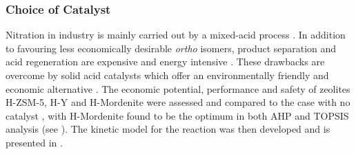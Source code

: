 \subsubsection{Choice of Catalyst}
Nitration in industry is mainly carried out by a mixed-acid process \cite{halder_nitration_2007}.
In addition to favouring less economically desirable \textit{ortho} isomers, product separation and acid regeneration are expensive and energy intensive \cite{sreedhar_scientific_2013}.
These drawbacks are overcome by solid acid catalysts which offer an environmentally friendly and economic alternative \cite{vassena_selective_1999}.
The economic potential, performance and safety of zeolites H-ZSM-5, H-Y and H-Mordenite were assessed and compared to the case with no catalyst \cite{jeeru_kinetics_2018}, with H-Mordenite found to be the optimum in both AHP and TOPSIS analysis (see ).
The kinetic model for the reaction was then developed and is presented in .

\begin{comment}
Nitration in industry is mainly carried out by a mixed-acid process, whereby sulfuric acid donates a proton to nitric acid, yielding a nitronium ion which will then react with toluene []. In addition to favouring less economically desirable \textit{ortho} isomers, product separation from the acid and acid regeneration are expensive and energy intensive \cite{sreedhar_scientific_2013}. These drawbacks can be overcome by using solid acid catalysts which offer an environmentally friendly and economic alternative to sulfuric acid \cite{vassena_selective_1999}. Based on those arguments, Nitroma will develop a safer and low environmental impact process employing zeolite catalysts for toluene nitration. More specifically, the relative benefits and disadvantages of 3 different zeolites were evaluated with the AHP and TOPSIS decision analysis methods to select the optimum catalyst. The economic potential, performance and safety of zeolites H-ZSM-5, H-Y and H-Mordenite were assessed and compared to the case with no catalyst \cite{jeeru_kinetics_2018}. The economic potential was measured with the cost of the catalyst and the percentage of undesirable by-product formed. Conversion and the NFPA score are the KPIs for performance and safety respectively. H-Mordenite was found optimum for the catalytic nitration of toluene by both AHP and TOPSIS analysis (\Cref{app:matrix}). The kinetic model for the reaction was then developed and is presented in \Cref{app:kinetics}.
\end{comment}

